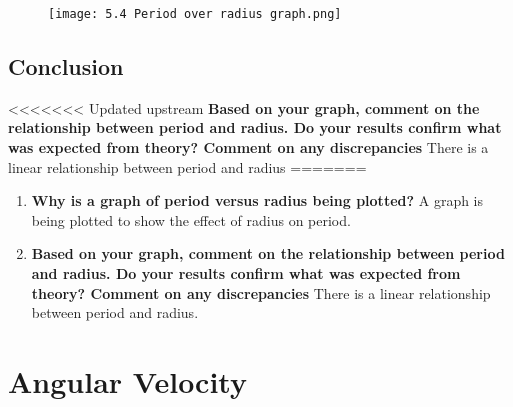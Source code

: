 		\begin{figure}[H]
			\centering
			\texttt{[image: 5.4 Period over radius graph.png]}
		\end{figure}

	\subsection{Conclusion}
<<<<<<< Updated upstream
		\textbf{Based on your graph, comment on the relationship between period and radius. Do your results confirm what was expected from theory? Comment on any discrepancies}
		There is a linear relationship between period and radius
=======
	\begin{enumerate}
		\item \textbf{Why is a graph of period versus radius being plotted?}
			\subitem A graph is being plotted to show the effect of radius on period.
		\item \textbf{Based on your graph, comment on the relationship between period and radius. Do your results confirm what was expected from theory? Comment on any discrepancies}
			\subitem There is a linear relationship between period and radius.
	\end{enumerate}

\section{Angular Velocity} \label{18/11/2024}
